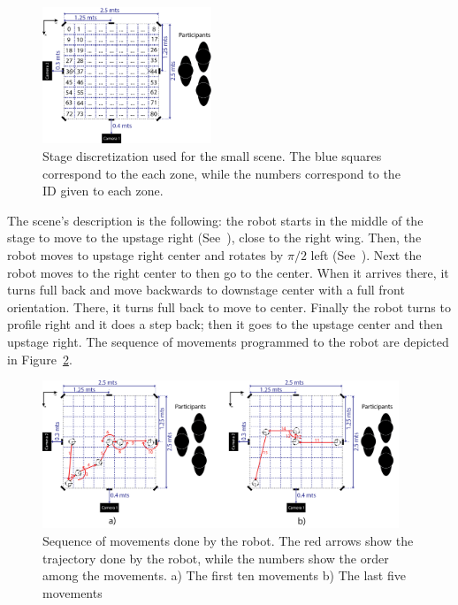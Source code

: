 \begin{figure}
	\centering
	\includegraphics[width=0.45\textwidth]{./Images/FourthCaseScene.png} 
	\caption{Stage discretization  used for the small scene. The blue squares correspond to the each zone, while the numbers correspond to the ID given to each zone.}
	\label{fig:stage_division}
\end{figure} 

The scene's description is the following: the robot starts in the middle of the stage to move to the upstage right (See~\cite{Musical}), close to the right wing. Then, the robot moves to upstage right center and rotates by $\pi/2$ left (See~\cite{Artopia}). Next the robot moves to the right center to then go to the center. When it arrives there, it turns full back and move backwards to downstage center with a full front orientation. There, it turns full back to move to center. Finally the robot turns to profile right and it does a step back; then it goes to the upstage center and then upstage right. The sequence of movements programmed to the robot are depicted in Figure~\ref{fig:movement}.
\begin{figure}
	\centering
	\includegraphics[width=0.95\textwidth]{./Images/fourthCaseSceneD.png} 
	\caption{Sequence of movements done by the robot. The red arrows show the trajectory done by the robot, while the numbers show the order among the movements. a) The first ten movements b) The last five movements }
	\label{fig:movement}
\end{figure}

